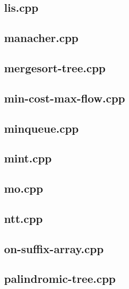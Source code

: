 \documentclass[a4paper,12pt]{article}
\begin{document}
\subsection{lis.cpp}


\subsection{manacher.cpp}


\subsection{mergesort-tree.cpp}


\subsection{min-cost-max-flow.cpp}


\subsection{minqueue.cpp}


\subsection{mint.cpp}


\subsection{mo.cpp}


\subsection{ntt.cpp}


\subsection{on-suffix-array.cpp}


\subsection{palindromic-tree.cpp}

\end{document}
